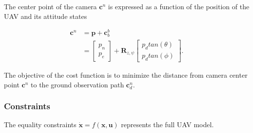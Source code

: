 The center point of the camera $\mathbf{c}^n$ is expressed as a function of the position of the UAV and its attitude states

\begin{equation}
\begin{split}
	\mathbf{c}^n & = \mathbf{p} + \mathbf{c}_b^b \\
	& =
	\begin{bmatrix}
		p_n \\ p_e
	\end{bmatrix}
	+ \mathbf{R}_{z,\psi}
	\begin{bmatrix}
		p_d tan(\theta) \\ p_d tan(\phi)
	\end{bmatrix}.
\end{split}
\end{equation}

The objective of the cost function is to minimize the distance from camera center point $\mathbf{c}^n$ to the ground observation path $\mathbf{c}_d^n$. 


\subsubsection*{Constraints}

The equality constraints $\mathbf{\dot{x}} = f(\mathbf{x},\mathbf{u})$ represents the full UAV model. 